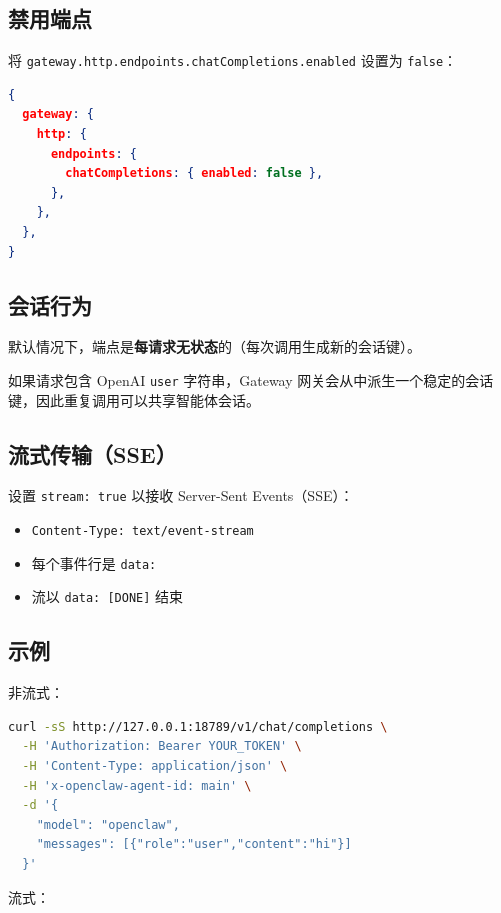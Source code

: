 \subsection{禁用端点}


将 \texttt{gateway.http.endpoints.chatCompletions.enabled} 设置为 \texttt{false}：

\begin{lstlisting}[language=json]
{
  gateway: {
    http: {
      endpoints: {
        chatCompletions: { enabled: false },
      },
    },
  },
}
\end{lstlisting}


\subsection{会话行为}


默认情况下，端点是\textbf{每请求无状态}的（每次调用生成新的会话键）。

如果请求包含 OpenAI \texttt{user} 字符串，Gateway 网关会从中派生一个稳定的会话键，因此重复调用可以共享智能体会话。

\subsection{流式传输（SSE）}


设置 \texttt{stream: true} 以接收 Server-Sent Events（SSE）：

\begin{itemize}
  \item \texttt{Content-Type: text/event-stream}
  \item 每个事件行是 \texttt{data: }
  \item 流以 \texttt{data: [DONE]} 结束
\end{itemize}


\subsection{示例}


非流式：

\begin{lstlisting}[language=bash]
curl -sS http://127.0.0.1:18789/v1/chat/completions \
  -H 'Authorization: Bearer YOUR_TOKEN' \
  -H 'Content-Type: application/json' \
  -H 'x-openclaw-agent-id: main' \
  -d '{
    "model": "openclaw",
    "messages": [{"role":"user","content":"hi"}]
  }'
\end{lstlisting}


流式：

